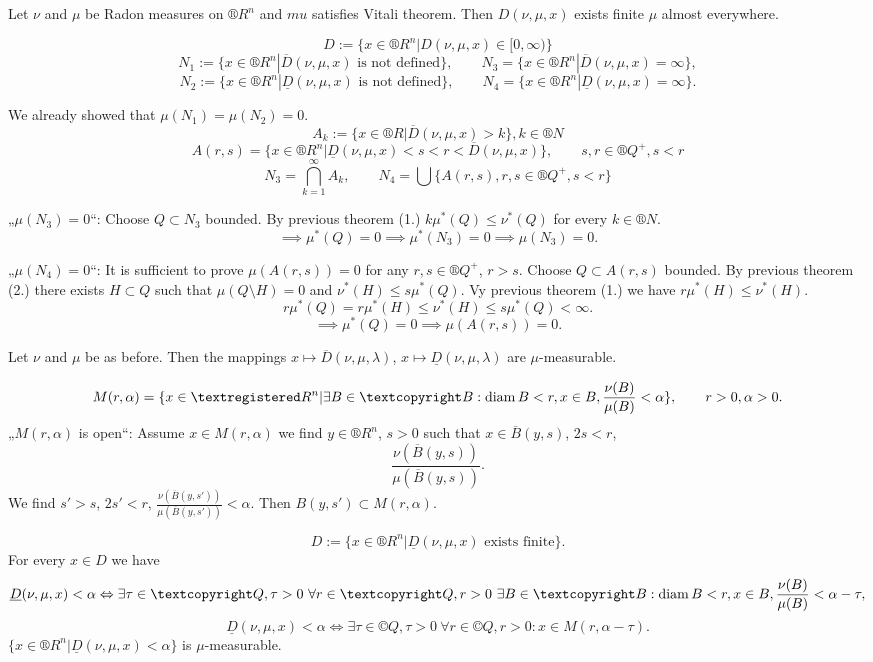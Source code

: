 \documentclass[12pt]{article}					%
\begin{document}
\begin{veta}
	Let $\nu$ and $\mu$ be Radon measures on $®R^n$ and $mu$ satisfies Vitali theorem. Then $D(\nu, \mu, x)$ exists finite $\mu$ almost everywhere.

	\begin{dukazin}
		$$ D := \{x \in ®R^n | D(\nu, \mu, x) \in [0, ∞)\} $$
		$$ N_1 := \{x \in ®R^n | \overline{D}(\nu, \mu, x) \text{ is not defined}\}, \qquad N_3 = \{x \in ®R^n | \overline{D}(\nu, \mu, x) = ∞\}, $$
		$$ N_2 := \{x \in ®R^n | \underline{D}(\nu, \mu, x) \text{ is not defined}\}, \qquad N_4 = \{x \in ®R^n | \underline{D}(\nu, \mu, x) = ∞\}. $$

		We already showed that $\mu(N_1) = \mu(N_2) = 0$.
		$$ A_k := \{x \in ®R | \overline{D}(\nu, \mu, x) > k\}, k \in ®N $$
		$$ A(r, s) = \{x \in ®R^n | \underline{D}(\nu, \mu, x) < s < r < \overline{D}(\nu, \mu, x)\}, \qquad s, r \in ®Q^+, s < r $$
		$$ N_3 = \bigcap_{k=1}^∞ A_k, \qquad N_4 = \bigcup \{A(r, s), r, s \in ®Q^+, s < r\} $$

		„$\mu(N_3) = 0$“: Choose $Q \subset N_3$ bounded. By previous theorem (1.) $k \mu^*(Q) ≤ \nu^*(Q)$ for every $k \in ®N$.
		$$ \implies \mu^*(Q) = 0 \implies \mu^*(N_3) = 0 \implies \mu(N_3) = 0. $$

		„$\mu(N_4) = 0$“: It is sufficient to prove $\mu(A(r, s)) = 0$ for any $r, s \in ®Q^+$, $r > s$. Choose $Q \subset A(r, s)$ bounded. By previous theorem (2.) there exists $H \subset Q$ such that $\mu(Q \setminus H) = 0$ and $\nu^*(H) ≤ s \mu^*(Q)$.
		Vy previous theorem (1.) we have $r \mu^*(H) ≤ \nu^*(H)$.
		$$ r \mu^*(Q) = r \mu^*(H) ≤ \nu^*(H) ≤ s \mu^*(Q) < ∞. $$
		$$ \implies \mu^*(Q) = 0 \implies \mu(A(r, s)) = 0. $$
	\end{dukazin}
\end{veta}

\begin{lemma}
	Let $\nu$ and $\mu$ be as before. Then the mappings $x \mapsto \overline{D}(\nu, \mu, \lambda)$, $x \mapsto \underline{D}(\nu, \mu, \lambda)$ are $\mu$-measurable.

	\begin{dukazin}
		$$ M(r, \alpha) = \{x \in ®R^n | \exists B \in ©B: \diam B < r, x \in B, \frac{\nu(B)}{\mu(B)} < \alpha\}, \qquad r > 0, \alpha > 0. $$
		„$M(r, \alpha)$ is open“: Assume $x \in M(r, \alpha)$ we find $y \in ®R^n$, $s > 0$ such that $x \in \overline{B}(y, s)$, $2s < r$,
		$$ \frac{\nu(\overline{B}(y, s))}{\mu(\overline{B}(y, s))}. $$
		We find $s' > s$, $2s' < r$, $\frac{\nu(\overline{B}(y, s'))}{\mu(\overline{B}(y, s'))} < \alpha$. Then $B(y, s') \subset M(r, \alpha)$.

		$$ D := \{x \in ®R^n | \underline{D}(\nu, \mu, x) \text{ exists finite}\}. $$
		For every $x \in D$ we have
		$$ \underline{D}(\nu, \mu, x) < \alpha \Leftrightarrow \exists \tau \in ©Q, \tau > 0\ \forall r \in ©Q, r > 0\ \exists B \in ©B: \diam B < r, x \in B, \frac{\nu(B)}{\mu(B)} < \alpha - \tau, $$
		$$ \underline{D}(\nu, \mu, x) < \alpha \Leftrightarrow \exists \tau \in ©Q, \tau > 0\ \forall r \in ©Q, r > 0: x \in M(r, \alpha - \tau). $$
		$\{x \in ®R^n | \underline{D}(\nu, \mu, x) < \alpha\}$ is $\mu$-measurable.
	\end{dukazin}
\end{lemma}
\end{document}
